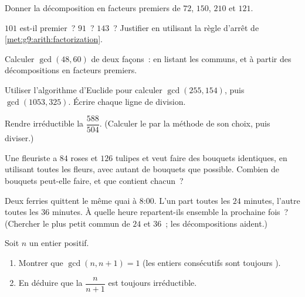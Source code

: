 \begin{exercise}[$\star$]\label{exo:g9:arith:3}
Donner la décomposition en facteurs premiers de $72$, $150$, $210$ et
$121$.
\end{exercise}

\begin{exercise}[$\star$]\label{exo:g9:arith:4}
$101$ est-il premier~? $91$~? $143$~? Justifier en utilisant la règle
d'arrêt de \cref{met:g9:arith:factorization}.
\end{exercise}

\begin{exercise}[$\star$]\label{exo:g9:arith:5}
Calculer $\gcd(48, 60)$ de deux façons~: en listant les 
communs, et à partir des décompositions en facteurs premiers.
\end{exercise}

\begin{exercise}[$\star\star$]\label{exo:g9:arith:6}
Utiliser l'algorithme d'Euclide pour calculer $\gcd(255, 154)$, puis
$\gcd(1053, 325)$. Écrire chaque ligne de division.
\end{exercise}

\begin{exercise}[$\star\star$]\label{exo:g9:arith:7}
Rendre irréductible la  $\dfrac{588}{504}$. (Calculer le 
par la méthode de son choix, puis diviser.)
\end{exercise}

\begin{exercise}[$\star\star$]\label{exo:g9:arith:8}
Une fleuriste a $84$ roses et $126$ tulipes et veut faire des bouquets
identiques, en utilisant toutes les fleurs, avec autant de bouquets
que possible. Combien de bouquets peut-elle faire, et que contient
chacun~?
\end{exercise}

\begin{exercise}[$\star\star$]\label{exo:g9:arith:9}
Deux ferries quittent le même quai à 8:00. L'un part toutes les $24$
minutes, l'autre toutes les $36$ minutes. À quelle heure repartent-ils
ensemble la prochaine fois~? (Chercher le plus petit  commun de
$24$ et $36$~; les décompositions aident.)
\end{exercise}

\begin{exercise}[$\star\star\star$]\label{exo:g9:arith:10}
Soit $n$ un entier positif.
\begin{enumerate}
  \item Montrer que $\gcd(n, n+1) = 1$ (les entiers consécutifs sont
        toujours ).
  \item En déduire que la  $\dfrac{n}{n+1}$ est toujours
        irréductible.
\end{enumerate}
\end{exercise}

